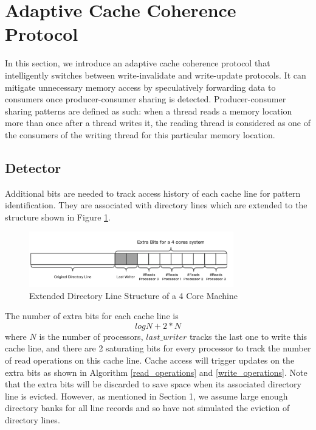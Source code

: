 \documentclass[11pt,conference]{IEEEtran}
\begin{document}
\section{Adaptive Cache Coherence Protocol}
In this section, we introduce an adaptive cache coherence protocol that intelligently switches between write-invalidate and write-update protocols. It can mitigate unnecessary memory access by speculatively forwarding data to consumers once producer-consumer sharing is detected. Producer-consumer sharing patterns are defined as such: when a thread reads a memory location more than once after a thread writes it, the reading thread is considered as one of the consumers of the writing thread for this particular memory location.


\subsection{Detector}

Additional bits are needed to track access history of each cache line for pattern identification. They are associated with directory lines which are extended to the structure shown in Figure \ref{dir_line}.

\begin{figure}[!h]
\centering
\captionsetup{justification=centering}
\includegraphics[width=3.5in]{dir_line.png}
\caption{Extended Directory Line Structure of a 4 Core Machine}
\label{dir_line}
\end{figure}
\FloatBarrier

The number of extra bits for each cache line is
\begin{equation*}
log N + 2 * N
\end{equation*}
where $N$ is the number of processors, $last\_writer$ tracks the last one to write this cache line, and there are 2 saturating bits for every processor to track the number of read operations on this cache line. Cache access will trigger updates on the extra bits as shown in Algorithm \ref{read_operations} and \ref{write_operations}. Note that the extra bits will be discarded to save space when its associated directory line is evicted. However, as mentioned in Section 1, we assume large enough directory banks for all line records and so have not simulated the eviction of directory lines.
\end{document}
